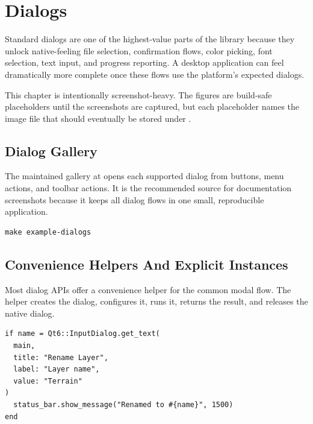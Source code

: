 \chapter{Dialogs}

Standard dialogs are one of the highest-value parts of the  library because they unlock native-feeling file selection, confirmation flows, color picking, font selection, text input, and progress reporting. A desktop application can feel dramatically more complete once these flows use the platform's expected dialogs.

This chapter is intentionally screenshot-heavy. The figures are build-safe placeholders until the screenshots are captured, but each placeholder names the image file that should eventually be stored under .

\section{Dialog Gallery}

The maintained gallery at  opens each supported dialog from buttons, menu actions, and toolbar actions. It is the recommended source for documentation screenshots because it keeps all dialog flows in one small, reproducible application.

\begin{lstlisting}[style=crystal]
make example-dialogs
\end{lstlisting}


\section{Convenience Helpers And Explicit Instances}

Most dialog APIs offer a convenience helper for the common modal flow. The helper creates the dialog, configures it, runs it, returns the result, and releases the native dialog.

\begin{lstlisting}[style=crystal]
if name = Qt6::InputDialog.get_text(
  main,
  title: "Rename Layer",
  label: "Layer name",
  value: "Terrain"
)
  status_bar.show_message("Renamed to #{name}", 1500)
end
\end{lstlisting}

